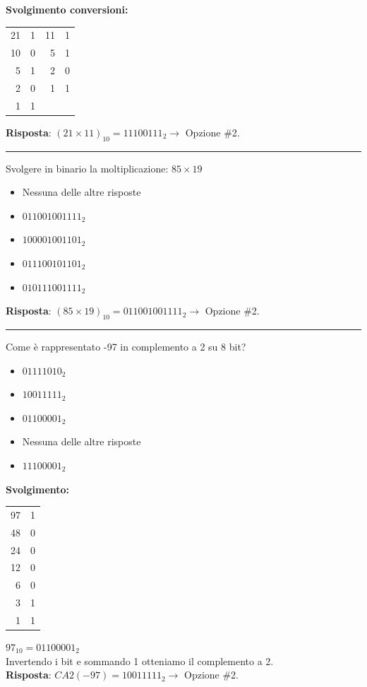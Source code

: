 \documentclass[12pt, a4paper]{article}
\begin{document}
\textbf{Svolgimento conversioni:}
\begin{center}
\begin{tabular}{r|c@{\hskip 1in}r|c}
21 & 1 & 11 & 1 \\
10 & 0 &  5 & 1 \\
 5 & 1 &  2 & 0 \\
 2 & 0 &  1 & 1 \\
 1 & 1 &    & 
\end{tabular}
\end{center}
\textbf{Risposta}: $(21 \times 11)_{10} = 11100111_2 \rightarrow$ Opzione \#2.

\vspace{0.5cm}
\hrule
\vspace{0.5cm}

Svolgere in binario la moltiplicazione: $85 \times 19$
\begin{itemize}
    \item[$\square$] Nessuna delle altre risposte
    \item[$\blacksquare$] $011001001111_2$
    \item[$\square$] $100001001101_2$
    \item[$\square$] $011100101101_2$
    \item[$\square$] $010111001111_2$
\end{itemize}

\textbf{Risposta}: $(85 \times 19)_{10} = 011001001111_2 \rightarrow$ Opzione \#2.

\vspace{0.5cm}
\hrule
\vspace{0.5cm}

Come è rappresentato -97 in complemento a 2 su 8 bit?
\begin{itemize}
    \item[$\square$] $01111010_2$
    \item[$\blacksquare$] $10011111_2$
    \item[$\square$] $01100001_2$
    \item[$\square$] Nessuna delle altre risposte
    \item[$\square$] $11100001_2$
\end{itemize}

\textbf{Svolgimento:}
\begin{center}
\begin{tabular}{r|c}
97 & 1 \\
48 & 0 \\
24 & 0 \\
12 & 0 \\
6 & 0 \\
3 & 1 \\
1 & 1 
\end{tabular}
\end{center}
$97_{10} = 01100001_2$ \\
Invertendo i bit e sommando 1 otteniamo il complemento a 2.\\
\textbf{Risposta}: $CA2(-97) = 10011111_2 \rightarrow$ Opzione \#2.
\end{document}

